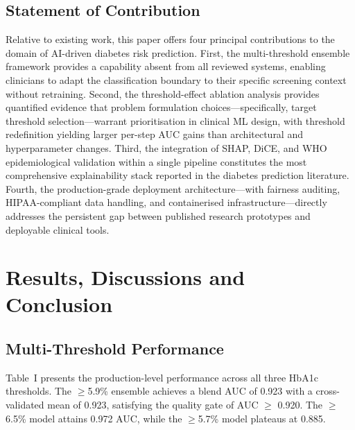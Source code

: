 \documentclass[conference]{IEEEtran}
\begin{document}
\subsection{Statement of Contribution}

Relative to existing work, this paper offers four principal contributions to the domain of AI-driven diabetes risk prediction. First, the multi-threshold ensemble framework provides a capability absent from all reviewed systems, enabling clinicians to adapt the classification boundary to their specific screening context without retraining. Second, the threshold-effect ablation analysis provides quantified evidence that problem formulation choices---specifically, target threshold selection---warrant prioritisation in clinical ML design, with threshold redefinition yielding larger per-step AUC gains than architectural and hyperparameter changes. Third, the integration of SHAP, DiCE, and WHO epidemiological validation within a single pipeline constitutes the most comprehensive explainability stack reported in the diabetes prediction literature. Fourth, the production-grade deployment architecture---with fairness auditing, HIPAA-compliant data handling, and containerised infrastructure---directly addresses the persistent gap between published research prototypes and deployable clinical tools.

\section{Results, Discussions and Conclusion}

\subsection{Multi-Threshold Performance}

Table~I presents the production-level performance across all three HbA1c thresholds. The $\geq$5.9\% ensemble achieves a blend AUC of 0.923 with a cross-validated mean of 0.923, satisfying the quality gate of AUC $\geq$ 0.920. The $\geq$6.5\% model attains 0.972 AUC, while the $\geq$5.7\% model plateaus at 0.885.
\end{document}
